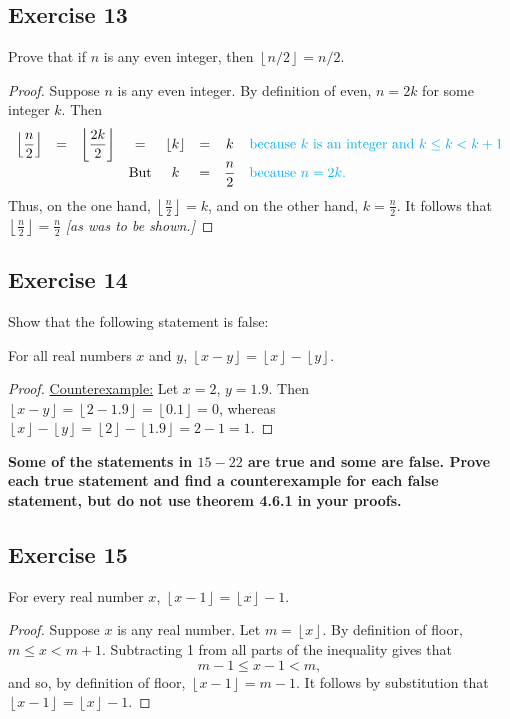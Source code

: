 \documentclass[14pt]{extarticle}
\newcommand{\dps}{\displaystyle}
\newcommand{\cy}{\color{cyan}}
\newcommand{\floor}[1]{{\left\lfloor#1\right\rfloor}}
\begin{document}
\subsection{Exercise 13}
Prove that if $n$ is any even integer, then $\floor{n/2} = n/2$.

\begin{proof}
    Suppose $n$ is any even integer. By definition of even, $n = 2k$ for some integer $k$. Then
    \[
        \begin{array}{cccccccl}
            \dps\floor{\frac{n}{2}} & = & \dps\floor{\frac{2k}{2}} & =          & \dps\floor{k} & = & k               & \text{\cy because $k$ is an integer and $k \leq k < k+1$} \\
                                    &   &                          & \text{But} & k             & = & \dps\frac{n}{2} & \text{\cy because $n = 2k$.}                              \\
        \end{array}
    \]
    Thus, on the one hand, $\floor{\frac{n}{2}} = k$, and on the other hand, $k = \frac{n}{2}$. It follows that $\floor{\frac{n}{2}} = \frac{n}{2}$ {\it [as was to be shown.]}
\end{proof}

\subsection{Exercise 14}
Show that the following statement is false:

For all real numbers $x$ and $y$, $\floor{x-y} = \floor{x} - \floor{y}$.

\begin{proof}
    \underline{Counterexample:} Let $x = 2$, $y = 1.9$. Then $\floor{x-y} = \floor{2-1.9} = \floor{0.1} = 0$, whereas $\floor{x} - \floor{y} = \floor{2} - \floor{1.9} = 2-1 = 1$.
\end{proof}

{\bf \cy Some of the statements in $15-22$ are true and some are false. Prove each true statement and find a counterexample for each false statement, but do not use theorem 4.6.1 in your proofs.}

\subsection{Exercise 15}
For every real number $x$, $\floor{x - 1} = \floor{x} - 1$.

\begin{proof}
    Suppose $x$ is any real number. Let $m = \floor{x}$. By definition of floor,\\ $m \leq x < m + 1$. Subtracting 1 from
    all parts of the inequality gives that
    \[
        m - 1 \leq x - 1 < m,
    \]
    and so, by definition of floor, $\floor{x - 1} = m - 1$. It follows by substitution that\\ $\floor{x - 1} = \floor{x} - 1$.

\end{proof}
\end{document}
